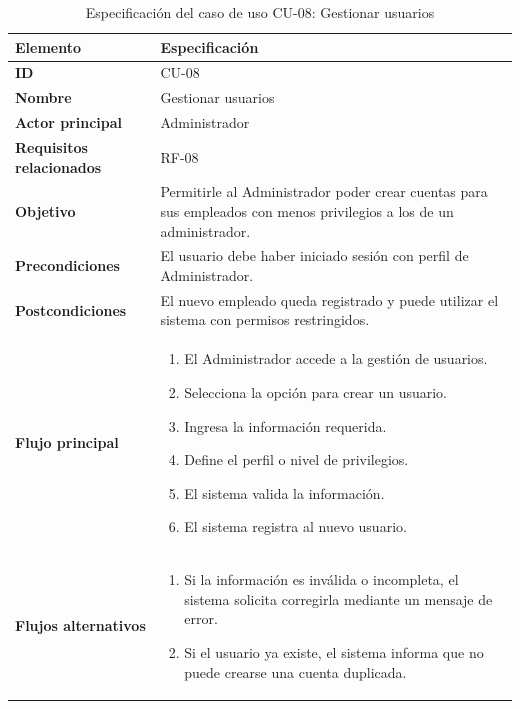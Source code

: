 \begin{table}[H]
\centering
\caption{Especificación del caso de uso CU-08: Gestionar usuarios}
\label{tab:cu08_gestionar_usuarios}
\renewcommand{\arraystretch}{1.3}
\begin{tabularx}{\textwidth}{|>{\bfseries}p{3.5cm}|X|}
\hline
Elemento & Especificación \\
\hline
ID & CU-08 \\
\hline
Nombre & Gestionar usuarios \\
\hline
Actor principal & Administrador \\
\hline
Requisitos relacionados & RF-08 \\
\hline
Objetivo & Permitirle al Administrador poder crear cuentas para sus empleados con menos privilegios a los de un administrador. \\
\hline
Precondiciones & El usuario debe haber iniciado sesión con perfil de Administrador. \\
\hline
Postcondiciones & El nuevo empleado queda registrado y puede utilizar el sistema con permisos restringidos. \\
\hline
Flujo principal &
\begin{enumerate}
    \item El Administrador accede a la gestión de usuarios.
    \item Selecciona la opción para crear un usuario.
    \item Ingresa la información requerida.
    \item Define el perfil o nivel de privilegios.
    \item El sistema valida la información.
    \item El sistema registra al nuevo usuario.
\end{enumerate} \\
\hline
Flujos alternativos &
\begin{enumerate}
    \item Si la información es inválida o incompleta, el sistema solicita corregirla mediante un mensaje de error.
    \item Si el usuario ya existe, el sistema informa que no puede crearse una cuenta duplicada.
\end{enumerate} \\
\hline
\end{tabularx}
\end{table}

